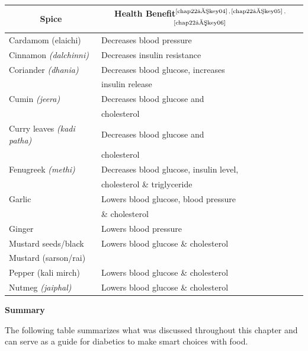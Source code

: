 \vskip 12pt
\begin{longtable}{|l|l|}
\hline
\multicolumn{1}{|c|}{\textbf{Spice}} & \multicolumn{1}{c|}{\textbf{Health Benefit}$^{\text{\cite{chap22–key04}}}$$^,$$^{\text{\cite{chap22–key05}}}$$^,$$^{\text{\cite{chap22–key06}}}$}\\
\hline
Cardamom (elaichi) & Decreases blood pressure\\
\hline
Cinnamon \textit{(dalchinni)} & Decreases insulin resistance\\
\hline
Coriander \textit{(dhania)} & Decreases blood glucose, increases\\
 & insulin release\\
\hline
Cumin \textit{(jeera)} & Decreases blood glucose and\\
 & cholesterol\\
\hline
Curry leaves \textit{(kadi patha)} & Decreases blood glucose and\\
 & cholesterol\\
\hline
Fenugreek \textit{(methi)} & Decreases blood glucose, insulin level,\\
 & cholesterol \& triglyceride\\
\hline
Garlic & Lowers blood glucose, blood pressure\\
 & \& cholesterol\\
\hline
Ginger & Lowers blood pressure\\
\hline
Mustard seeds/black & Lowers blood glucose \& cholesterol\\
\hline
Mustard (sarson/rai) &\\
Pepper (kali mirch) & Lowers blood glucose \& cholesterol\\
\hline
Nutmeg \textit{(jaiphal)} & Lowers blood glucose \& cholesterol\\
\hline
\end{longtable}

\noindent\textbf{Summary}

The following table summarizes what was discussed throughout this chapter and can serve as a guide for diabetics to make smart choices with food.

\clearpage

